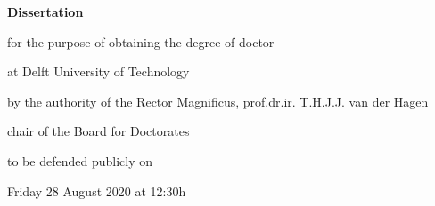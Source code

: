 \begin{titlepage}
	
	
%
%
%
%
%
%

\thispagestyle{empty}

\begin{center}


\vspace*{2\bigskipamount}

{\makeatletter
\titlestyle\bfseries\LARGE\@title
\par
\makeatother}

{\makeatletter
\ifx\@subtitle\undefined\else
    \bigskip
    \titlefont\titleshape\Large\@subtitle
\fi
\makeatother}

\vfill


{\Large\titlefont\bfseries Dissertation}

\bigskip
\bigskip

for the purpose of obtaining the degree of doctor

at Delft University of Technology

by the authority of the Rector Magnificus, prof.dr.ir. T.H.J.J. van der Hagen

chair of the Board for Doctorates

to be defended publicly on

Friday 28 August 2020 at 12:30h


\end{center}
\end{titlepage}
